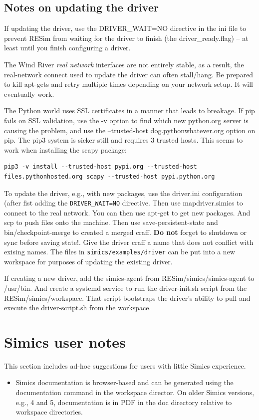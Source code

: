 \documentclass[titlepage]{article}
\begin{document}
\begin{appendices}
\subsection{Notes on updating the driver}
If updating the driver, use the DRIVER\_WAIT=NO directive in the ini file to prevent RESim from waiting for the driver to finish 
(the driver\_ready.flag) -- at least until you finish configuring a driver.

The Wind River \textit{real network} interfaces are not entirely stable, as a result, the real-network connect used to update the driver can often stall/hang.
Be prepared to kill apt-gets and retry multiple times depending on your network setup.  It will eventually work.

The Python world uses SSL certificates in a manner that leads to breakage.  If pip fails on SSL validation, use the -v option
to find which new python.org server is causing the problem, and use the --trusted-host dog.pythonwhatever.org option on pip.
The pip3 system is sicker still and requires 3 trusted hosts.  This seems to work when installing the scapy package:
\begin{verbatim}
pip3 -v install --trusted-host pypi.org --trusted-host files.pythonhosted.org scapy --trusted-host pypi.python.org
\end{verbatim}

To update the driver, e.g., with new packages, use the driver.ini configuration (after fist adding the {\tt DRIVER\_WAIT=NO} directive.  Then use mapdriver.simics to connect to the real network.
You can then use apt-get to get new packages.  And scp to push files onto the machine.  Then use save-persistent-state and bin/checkpoint-merge to
created a merged craff.  \textbf{Do not} forget to shutdown or sync before saving state!.  Give the driver craff a name that does not conflict with exising names.
The files in {\tt simics/examples/driver} can be put into a new workspace for purposes of updating the existing driver.

If creating a new driver, add the simics-agent from RESim/simics/simics-agent to /usr/bin.  And create a systemd service to run the
driver-init.sh script from the RESim/simics/workspace.  That script bootstraps the driver's ability to pull
and execute the driver-script.sh from the workspace.

\section{Simics user notes}
This section includes ad-hoc suggestions for users with little Simics experience.
\begin{itemize}
\item Simics documentation is browser-based and can be generated using the documentation command in the workspace director.  On older Simics versions,
e.g., 4 and 5, documentation is in PDF in the doc directory relative to workspace directories.


\end{itemize}
\end{appendices}
\end{document}
